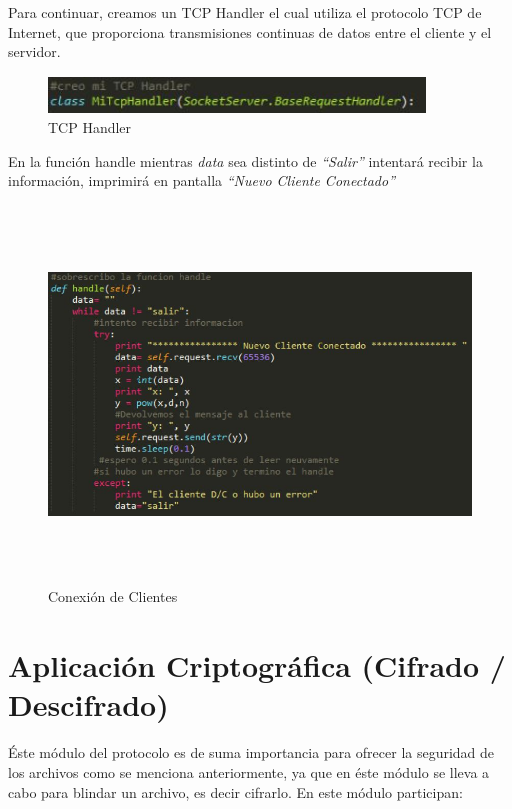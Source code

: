 Para continuar, creamos un TCP Handler el cual utiliza el protocolo TCP de Internet, que proporciona transmisiones continuas de datos entre el cliente y el servidor.
 
			\begin{figure}[H]
			\centering
			\includegraphics[width=10cm, height=1cm]{./images/servidor/03.jpg}
			\caption{TCP Handler}
			\label{fig:6-1-3} 
			\end{figure}

En la función handle mientras \textit{data} sea distinto de \textit{“Salir”} intentará recibir la información, imprimirá en pantalla \textit{“Nuevo Cliente Conectado”} 

			\begin{figure}[H]
			\centering
			\includegraphics[width=14cm, height=10cm]{./images/servidor/04.jpg}
			\caption{Conexión de Clientes}
			\label{fig:6-1-4} 
			\end{figure}



\section{Aplicación Criptográfica (Cifrado / Descifrado)}

Éste módulo del protocolo es de suma importancia para ofrecer la seguridad de los archivos como se menciona anteriormente, ya que en éste módulo se lleva a cabo para blindar un archivo, es decir cifrarlo.  En este módulo participan: 

